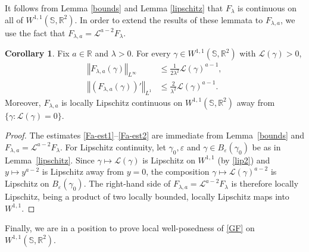 \documentclass[a4paper,11pt]{amsart}
\theoremstyle{definition}\newtheorem*{definition}{Definition}
\theoremstyle{definition} \newtheorem{proposition}[theorem]{Proposition}
\theoremstyle{definition}\newtheorem{lemma}[theorem]{Lemma}
\theoremstyle{definition}\newtheorem{corollary}[theorem]{Corollary}
\theoremstyle{definition}\newtheorem{example}{Example}
\theoremstyle{remark}\newtheorem*{remark}{Remark}
\def\R{\mathbb{R}}
\def\S{\mathbb{S}}
\newcommand{\norm}[1]{{\left \Vert {#1}\right \Vert}}
\def\length{\mathcal L}
\def\wsr{W^{1,1}(\S,\R^2)}
\begin{document}
It follows from Lemma \ref{bounds} and Lemma \ref{lipschitz} that $F_\lambda$ is continuous on all of $\wsr$. 
In order to extend the results of these lemmata to $F_{\lambda,a}$, we use the fact that $F_{\lambda,a}=\length^{a-2}F_\lambda$.

\begin{corollary}\label{Fa-bounds}
Fix $a\in\R$ and $\lambda>0$. For every $\gamma\in W^{1,1}(\S,\R^2)$ with $\length(\gamma)>0$,
\begin{align}\label{Fa-est1}
\norm{F_{\lambda,a}(\gamma)}_{L^\infty}&\leq \frac{1}{2\lambda^2}\length(\gamma)^{a-1},\\
\label{Fa-est2}
\norm{(F_{\lambda,a}(\gamma))'}_{L^1}&\leq \frac{2}{\lambda^2}\length(\gamma)^{a-1}.
\end{align}
Moreover, $F_{\lambda,a}$ is locally Lipschitz continuous on $W^{1,1}(\S,\R^2)$ away from $\{\gamma:\length(\gamma)=0\}$.
\end{corollary}
\begin{proof}
The estimates \eqref{Fa-est1}--\eqref{Fa-est2} are immediate from Lemma~\ref{bounds} and $F_{\lambda,a}=\length^{a-2}F_\lambda$.
For Lipschitz continuity, let $\gamma_0,\varepsilon$ and $\gamma\in B_\varepsilon(\gamma_0)$ be as in Lemma~\ref{lipschitz}. Since $\gamma\mapsto \length(\gamma)$ is Lipschitz on $W^{1,1}$ (by \eqref{lip2}) and $y\mapsto y^{a-2}$ is Lipschitz away from $y=0$, the composition $\gamma\mapsto \length(\gamma)^{a-2}$ is Lipschitz on $B_\varepsilon(\gamma_0)$. The right-hand side of $F_{\lambda,a}=\length^{a-2}F_\lambda$ is therefore locally Lipschitz, being a product of two locally bounded, locally Lipschitz maps into $W^{1,1}$.
\end{proof}

Finally, we are in a position to prove local well-posedness of \eqref{GF} on $\wsr$.
\end{document}
